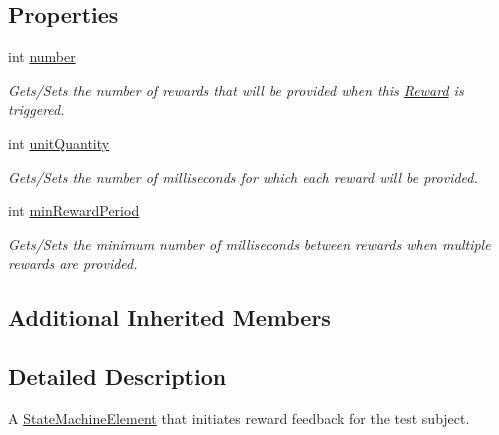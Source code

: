 \subsection*{Properties}
\begin{DoxyCompactItemize}
\item 
\hypertarget{class_picto_1_1_reward_aea0deede63935e3526664a8c2315e1c4}{int \hyperlink{class_picto_1_1_reward_aea0deede63935e3526664a8c2315e1c4}{number}}\label{class_picto_1_1_reward_aea0deede63935e3526664a8c2315e1c4}

\begin{DoxyCompactList}\small\item\em Gets/\-Sets the number of rewards that will be provided when this \hyperlink{class_picto_1_1_reward}{Reward} is triggered. \end{DoxyCompactList}\item 
\hypertarget{class_picto_1_1_reward_afd848dc195436c0a85f8637b5ed1ae19}{int \hyperlink{class_picto_1_1_reward_afd848dc195436c0a85f8637b5ed1ae19}{unit\-Quantity}}\label{class_picto_1_1_reward_afd848dc195436c0a85f8637b5ed1ae19}

\begin{DoxyCompactList}\small\item\em Gets/\-Sets the number of milliseconds for which each reward will be provided. \end{DoxyCompactList}\item 
\hypertarget{class_picto_1_1_reward_ad06e280ebc6025df96111d994068c1e9}{int \hyperlink{class_picto_1_1_reward_ad06e280ebc6025df96111d994068c1e9}{min\-Reward\-Period}}\label{class_picto_1_1_reward_ad06e280ebc6025df96111d994068c1e9}

\begin{DoxyCompactList}\small\item\em Gets/\-Sets the minimum number of milliseconds between rewards when multiple rewards are provided. \end{DoxyCompactList}\end{DoxyCompactItemize}
\subsection*{Additional Inherited Members}


\subsection{Detailed Description}
A \hyperlink{class_picto_1_1_state_machine_element}{State\-Machine\-Element} that initiates reward feedback for the test subject. 

